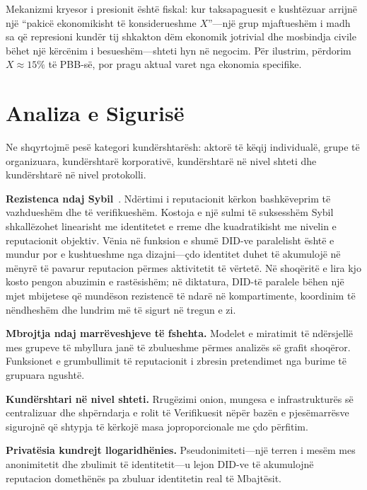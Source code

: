 \documentclass[11pt,a4paper,twocolumn]{article}
\begin{document}
Mekanizmi kryesor i presionit është fiskal: kur taksapaguesit e kushtëzuar arrijnë një ``pakicë ekonomikisht të konsiderueshme $X$''---një grup mjaftueshëm i madh sa që represioni kundër tij shkakton dëm ekonomik jotrivial dhe mosbindja civile bëhet një kërcënim i besueshëm---shteti hyn në negocim. Për ilustrim, përdorim $X \approx 15\%$ të PBB-së, por pragu aktual varet nga ekonomia specifike.

\section{Analiza e Sigurisë}

Ne shqyrtojmë pesë kategori kundërshtarësh: aktorë të këqij individualë, grupe të organizuara, kundërshtarë korporativë, kundërshtarë në nivel shteti dhe kundërshtarë në nivel protokolli.

\textbf{Rezistenca ndaj Sybil}~\cite{douceur2002}. Ndërtimi i reputacionit kërkon bashkëveprim të vazhdueshëm dhe të verifikueshëm. Kostoja e një sulmi të suksesshëm Sybil shkallëzohet linearisht me identitetet e rreme dhe kuadratikisht me nivelin e reputacionit objektiv. Vënia në funksion e shumë DID-ve paralelisht është e mundur por e kushtueshme nga dizajni---çdo identitet duhet të akumulojë në mënyrë të pavarur reputacion përmes aktivitetit të vërtetë. Në shoqëritë e lira kjo kosto pengon abuzimin e rastësishëm; në diktatura, DID-të paralele bëhen një mjet mbijetese që mundëson rezistencë të ndarë në kompartimente, koordinim të nëndheshëm dhe lundrim më të sigurt në tregun e zi.

\textbf{Mbrojtja ndaj marrëveshjeve të fshehta.} Modelet e miratimit të ndërsjellë mes grupeve të mbyllura janë të zbulueshme përmes analizës së grafit shoqëror. Funksionet e grumbullimit të reputacionit i zbresin pretendimet nga burime të grupuara ngushtë.

\textbf{Kundërshtari në nivel shteti.} Rrugëzimi onion, mungesa e infrastrukturës së centralizuar dhe shpërndarja e rolit të Verifikuesit nëpër bazën e pjesëmarrësve sigurojnë që shtypja të kërkojë masa joproporcionale me çdo përfitim.

\textbf{Privatësia kundrejt llogaridhënies.} Pseudonimiteti---një terren i mesëm mes anonimitetit dhe zbulimit të identitetit---u lejon DID-ve të akumulojnë reputacion domethënës pa zbuluar identitetin real të Mbajtësit.
\end{document}
